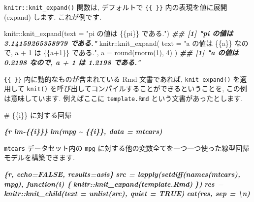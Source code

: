 \documentclass[
  11pt,
  lualatex,ja=standard,jafont=noto]{bxjsreport}
\newenvironment{Shaded}{\begin{snugshade}}{\end{snugshade}}
\newcommand{\AttributeTok}[1]{\textcolor[rgb]{0.77,0.63,0.00}{#1}}
\newcommand{\DecValTok}[1]{\textcolor[rgb]{0.00,0.00,0.81}{#1}}
\newcommand{\DocumentationTok}[1]{\textcolor[rgb]{0.56,0.35,0.01}{\textbf{\textit{#1}}}}
\newcommand{\FunctionTok}[1]{\textcolor[rgb]{0.00,0.00,0.00}{#1}}
\newcommand{\InformationTok}[1]{\textcolor[rgb]{0.56,0.35,0.01}{\textbf{\textit{#1}}}}
\newcommand{\NormalTok}[1]{#1}
\newcommand{\SpecialCharTok}[1]{\textcolor[rgb]{0.00,0.00,0.00}{#1}}
\newcommand{\StringTok}[1]{\textcolor[rgb]{0.31,0.60,0.02}{#1}}
\begin{document}
\texttt{knitr::knit\_expand()} 関数は, デフォルトで \texttt{\{\{ \}\}} 内の表現を値に展開 (expand) します. これが例です.

\begin{Shaded}
\begin{Highlighting}[numbers=left,,]
\NormalTok{knitr}\SpecialCharTok{::}\FunctionTok{knit\_expand}\NormalTok{(}\AttributeTok{text =} \StringTok{"\textasciigrave{}pi\textasciigrave{} の値は \{\{pi\}\} である."}\NormalTok{)}
\DocumentationTok{\#\# [1] "\textasciigrave{}pi\textasciigrave{} の値は 3.14159265358979 である."}
\NormalTok{knitr}\SpecialCharTok{::}\FunctionTok{knit\_expand}\NormalTok{(}
  \AttributeTok{text =} \StringTok{"\textasciigrave{}a\textasciigrave{} の値は \{\{a\}\} なので, \textasciigrave{}a + 1\textasciigrave{} は \{\{a+1\}\} である."}\NormalTok{,}
  \AttributeTok{a =} \FunctionTok{round}\NormalTok{(}\FunctionTok{rnorm}\NormalTok{(}\DecValTok{1}\NormalTok{), }\DecValTok{4}\NormalTok{)}
\NormalTok{)}
\DocumentationTok{\#\# [1] "\textasciigrave{}a\textasciigrave{} の値は 0.2198 なので, \textasciigrave{}a + 1\textasciigrave{} は 1.2198 である."}
\end{Highlighting}
\end{Shaded}

\texttt{\{\{ \}\}} 内に動的なものが含まれている Rmd 文書であれば, \texttt{knit\_expand()} を適用して \texttt{knit()} を呼び出してコンパイルすることができるということを, この例は意味しています. 例えばここに \texttt{template.Rmd} という文書があったとします.

\begin{Shaded}
\begin{Highlighting}[]
\FunctionTok{\# \{\{i\}\} に対する回帰}

\InformationTok{\textasciigrave{}\textasciigrave{}\textasciigrave{}\{r lm{-}\{\{i\}\}\}}
\InformationTok{lm(mpg \textasciitilde{} \{\{i\}\}, data = mtcars)}
\InformationTok{\textasciigrave{}\textasciigrave{}\textasciigrave{}}
\end{Highlighting}
\end{Shaded}

\texttt{mtcars} データセット内の \texttt{mpg} に対する他の変数全てを一つ一つ使った線型回帰モデルを構築できます.

\begin{Shaded}
\begin{Highlighting}[]
\InformationTok{\textasciigrave{}\textasciigrave{}\textasciigrave{}\{r, echo=FALSE, results=\textquotesingle{}asis\textquotesingle{}\}}
\InformationTok{src = lapply(setdiff(names(mtcars), \textquotesingle{}mpg\textquotesingle{}), function(i) \{}
\InformationTok{  knitr::knit\_expand(\textquotesingle{}template.Rmd\textquotesingle{})}
\InformationTok{\})}
\InformationTok{res = knitr::knit\_child(text = unlist(src), quiet = TRUE)}
\InformationTok{cat(res, sep = \textquotesingle{}\textbackslash{}n\textquotesingle{})}
\InformationTok{\textasciigrave{}\textasciigrave{}\textasciigrave{}}
\end{Highlighting}
\end{Shaded}
\end{document}
